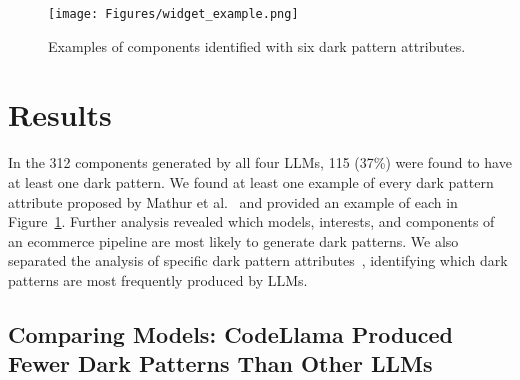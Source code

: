 \begin{figure}[]
  \centering
  \texttt{[image: Figures/widget\_example.png]}
  \caption{Examples of components identified with six dark pattern attributes.}
  \label{fig:widget_example}
\end{figure}

\section{Results}

In the 312 components generated by all four LLMs, 115 (37\%) were found to have at least one dark pattern. We found at least one example of every dark pattern attribute proposed by Mathur et al.~\cite{a:44} and provided an example of each in Figure~\ref{fig:widget_example}. Further analysis revealed which models, interests, and components of an ecommerce pipeline are most likely to generate dark patterns. We also separated the analysis of specific dark pattern attributes~\cite{a:44}, identifying which dark patterns are most frequently produced by LLMs. 

\subsection{Comparing Models: CodeLlama Produced Fewer Dark Patterns Than Other LLMs}


